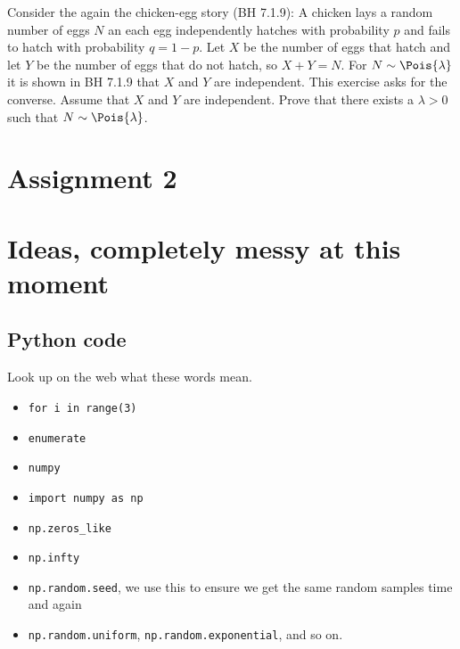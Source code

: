 \documentclass[a4paper]{article}
\begin{document}
\begin{exercise} %
Consider the again the chicken-egg story (BH 7.1.9): A chicken lays a random number of eggs $N$ an each egg independently hatches with probability $p$ and fails to hatch with probability $q = 1-p$. Let $X$ be the number of eggs that hatch and let $Y$ be the number of eggs that do not hatch, so $X+Y = N$. 
For $N \sim \Pois{\lambda}$ it is shown in BH 7.1.9 that $X$ and $Y$ are independent. This exercise asks for the converse. Assume that $X$ and $Y$ are independent. Prove that there exists a $\lambda > 0$ such that $N \sim \Pois{\lambda}$.
\end{exercise}



\section{Assignment 2}
\label{sec:assignment-2}



\section{Ideas, completely messy at this moment}
\label{sec:ideas-compl-messy}




\subsection{Python code}
\label{sec:org8074bd4}
Look up on the web what  these words mean. 
\begin{itemize}
\item \texttt{for i in range(3)}
\item \texttt{enumerate}
\item \texttt{numpy}
\item \texttt{import numpy as np}
\item \texttt{np.zeros\_like}
\item \texttt{np.infty}
\item \texttt{np.random.seed}, we  use this to ensure we get the same random samples time and again
\item \texttt{np.random.uniform}, \texttt{np.random.exponential}, and so on.
\end{itemize}
\end{document}
